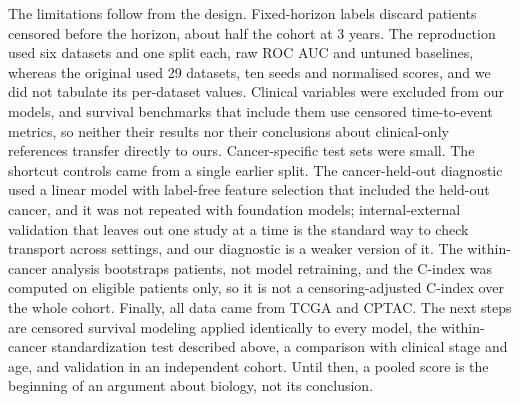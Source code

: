\documentclass[pdflatex,sn-nature]{sn-jnl}
\begin{document}
The limitations follow from the design. Fixed-horizon labels discard patients censored before the horizon, about half the cohort at 3 years. The reproduction used six datasets and one split each, raw ROC AUC and untuned baselines, whereas the original used 29 datasets, ten seeds and normalised scores, and we did not tabulate its per-dataset values. Clinical variables were excluded from our models, and survival benchmarks that include them use censored time-to-event metrics, so neither their results nor their conclusions about clinical-only references transfer directly to ours.\citep{herrmann2021benchmark,li2024combining} Cancer-specific test sets were small. The shortcut controls came from a single earlier split. The cancer-held-out diagnostic used a linear model with label-free feature selection that included the held-out cancer, and it was not repeated with foundation models; internal-external validation that leaves out one study at a time is the standard way to check transport across settings,\citep{riley2016external} and our diagnostic is a weaker version of it. The within-cancer analysis bootstraps patients, not model retraining, and the C-index was computed on eligible patients only, so it is not a censoring-adjusted C-index over the whole cohort. Finally, all data came from TCGA and CPTAC. The next steps are censored survival modeling applied identically to every model, the within-cancer standardization test described above, a comparison with clinical stage and age, and validation in an independent cohort. Until then, a pooled score is the beginning of an argument about biology, not its conclusion.
\end{document}
